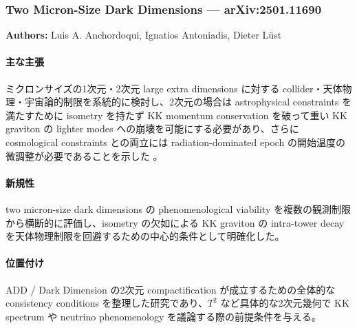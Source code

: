 \subsubsection{Two Micron-Size Dark Dimensions --- arXiv:2501.11690}

\textbf{Authors:} Luis A. Anchordoqui, Ignatios Antoniadis, Dieter L\"ust

\paragraph{主な主張}
ミクロンサイズの1次元・2次元 large extra dimensions に対する collider・天体物理・宇宙論的制限を系統的に検討し、2次元の場合は astrophysical constraints を満たすために isometry を持たず KK momentum conservation を破って重い KK graviton の lighter modes への崩壊を可能にする必要があり、さらに cosmological constraints との両立には radiation-dominated epoch の開始温度の微調整が必要であることを示した \cite{Anchordoqui:2025TwoMicron}。

\paragraph{新規性}
two micron-size dark dimensions の phenomenological viability を複数の観測制限から横断的に評価し、isometry の欠如による KK graviton の intra-tower decay を天体物理制限を回避するための中心的条件として明確化した。

\paragraph{位置付け}
ADD / Dark Dimension の2次元 compactification が成立するための全体的な consistency conditions を整理した研究であり、$T^2$ など具体的な2次元幾何で KK spectrum や neutrino phenomenology を議論する際の前提条件を与える。
